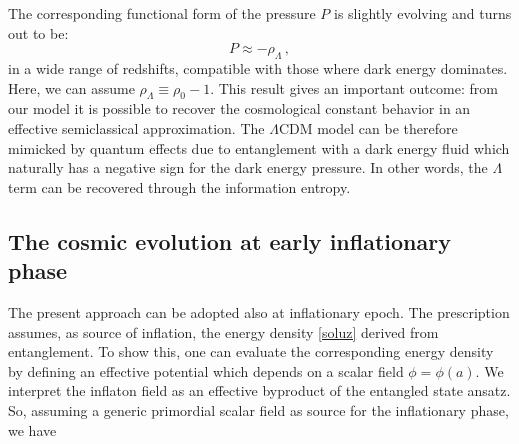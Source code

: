 \documentclass[nofootinbib,prd,superscriptaddress,showpacs,showkeys,]{revtex4}
\begin{document}
The corresponding functional form of the pressure $P$ is slightly evolving and turns out to be:
\begin{equation}\label{prex}
P\approx -\rho_\Lambda\,,
\end{equation}
in a wide range of redshifts, compatible with those where dark energy dominates. Here, we can assume $\rho_\Lambda\equiv \rho_0-1$. This result  gives an important outcome: from our model it is possible to recover the cosmological constant behavior in an effective semiclassical approximation. The $\Lambda$CDM model can be therefore mimicked by quantum effects due to entanglement with a dark energy fluid which naturally has a negative sign for the  dark energy pressure. In other words,  the $\Lambda$ term can be recovered through the  information entropy.









\subsection{The cosmic evolution at early inflationary phase}

The present approach can be adopted also  at inflationary epoch. The prescription assumes, as  source of inflation, the energy density \eqref{soluz} derived from entanglement. To show this, one can evaluate the corresponding energy density  by defining an effective potential which depends on a scalar field $\phi=\phi(a)$.  We interpret the inflaton field as an effective byproduct of the entangled state ansatz. So, assuming a generic primordial scalar field as source for the inflationary phase, we have
\end{document}
